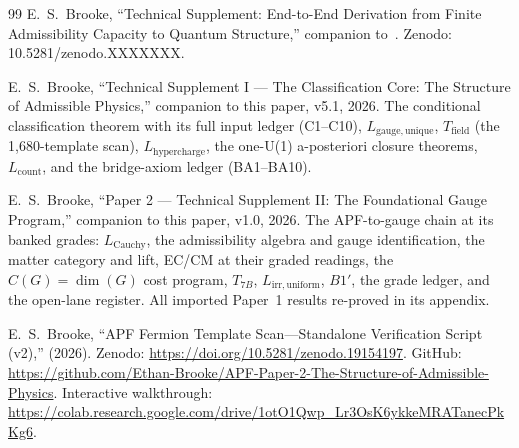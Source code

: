 \documentclass[11pt]{article}
\begin{document}
\begin{thebibliography}{99}
 E.~S.~Brooke, ``Technical Supplement: End-to-End Derivation from Finite Admissibility Capacity to Quantum Structure,'' companion to~\cite{BrookePaper1}.  Zenodo: 10.5281/zenodo.XXXXXXX.

 E.~S.~Brooke, ``Technical Supplement I --- The Classification Core: The Structure of Admissible Physics,'' companion to this paper, v5.1, 2026.  The conditional classification theorem with its full input ledger (C1--C10), $L_{\mathrm{gauge,unique}}$, $T_{\mathrm{field}}$ (the 1{,}680-template scan), $L_{\mathrm{hypercharge}}$, the one-U(1) a-posteriori closure theorems, $L_{\mathrm{count}}$, and the bridge-axiom ledger (BA1--BA10).

 E.~S.~Brooke, ``Paper 2 --- Technical Supplement II: The Foundational Gauge Program,'' companion to this paper, v1.0, 2026.  The APF-to-gauge chain at its banked grades: $L_{\mathrm{Cauchy}}$, the admissibility algebra and gauge identification, the matter category and lift, EC/CM at their graded readings, the $C(G) = \dim(G)$ cost program, $T_{7B}$, $L_{\mathrm{irr,uniform}}$, $B1'$, the grade ledger, and the open-lane register.  All imported Paper~1 results re-proved in its appendix.

 E.~S.~Brooke, ``APF Fermion Template Scan---Standalone Verification Script (v2),'' (2026).  Zenodo: \url{https://doi.org/10.5281/zenodo.19154197}.  GitHub: \url{https://github.com/Ethan-Brooke/APF-Paper-2-The-Structure-of-Admissible-Physics}.  Interactive walkthrough: \url{https://colab.research.google.com/drive/1otO1Qwp_Lr3OsK6ykkeMRATanecPkKg6}.

\end{thebibliography}
\end{document}
